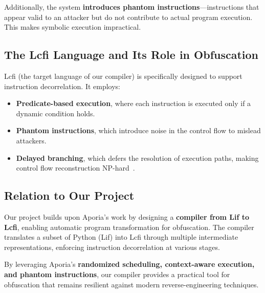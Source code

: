 Additionally, the system \textbf{introduces phantom instructions}—instructions that appear valid to an attacker but do not contribute to actual program execution. This makes symbolic execution impractical.

\subsection{The Lcfi Language and Its Role in Obfuscation}
Lcfi (the target language of our compiler) is specifically designed to support instruction decorrelation. It employs:
\begin{itemize}
    \item \textbf{Predicate-based execution}, where each instruction is executed only if a dynamic condition holds.
    \item \textbf{Phantom instructions}, which introduce noise in the control flow to mislead attackers.
    \item \textbf{Delayed branching}, which defers the resolution of execution paths, making control flow reconstruction NP-hard~\cite{ajorian2024aporia}.
\end{itemize}

\subsection{Relation to Our Project}
Our project builds upon Aporia’s work by designing a \textbf{compiler from Lif to Lcfi}, enabling automatic program transformation for obfuscation. The compiler translates a subset of Python (Lif) into Lcfi through multiple intermediate representations, enforcing instruction decorrelation at various stages.

By leveraging Aporia’s \textbf{randomized scheduling, context-aware execution, and phantom instructions}, our compiler provides a practical tool for obfuscation that remains resilient against modern reverse-engineering techniques.

